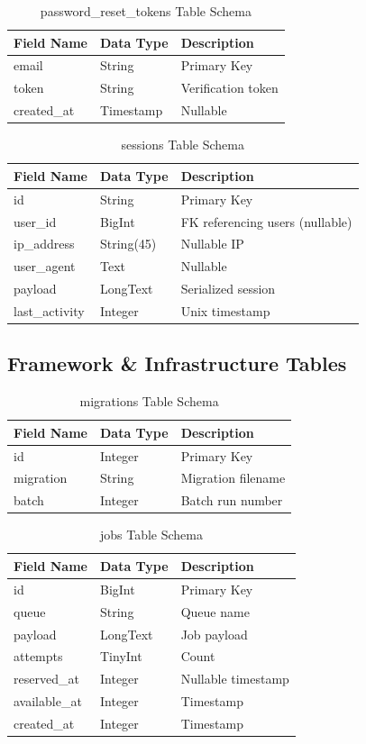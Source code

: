 \begin{longtable}{|l|l|p{7.5cm}|}
\caption{password\_reset\_tokens Table Schema} \\
\hline
\textbf{Field Name} & \textbf{Data Type} & \textbf{Description} \\ \hline
email & String & Primary Key \\ \hline
token & String & Verification token \\ \hline
created\_at & Timestamp & Nullable \\ \hline
\end{longtable}

\begin{longtable}{|l|l|p{7.5cm}|}
\caption{sessions Table Schema} \\
\hline
\textbf{Field Name} & \textbf{Data Type} & \textbf{Description} \\ \hline
id & String & Primary Key \\ \hline
user\_id & BigInt & FK referencing users (nullable) \\ \hline
ip\_address & String(45) & Nullable IP \\ \hline
user\_agent & Text & Nullable \\ \hline
payload & LongText & Serialized session \\ \hline
last\_activity & Integer & Unix timestamp \\ \hline
\end{longtable}

\subsection{Framework \& Infrastructure Tables}
\begin{longtable}{|l|l|p{7.5cm}|}
\caption{migrations Table Schema} \\
\hline
\textbf{Field Name} & \textbf{Data Type} & \textbf{Description} \\ \hline
id & Integer & Primary Key \\ \hline
migration & String & Migration filename \\ \hline
batch & Integer & Batch run number \\ \hline
\end{longtable}

\begin{longtable}{|l|l|p{7.5cm}|}
\caption{jobs Table Schema} \\
\hline
\textbf{Field Name} & \textbf{Data Type} & \textbf{Description} \\ \hline
id & BigInt & Primary Key \\ \hline
queue & String & Queue name \\ \hline
payload & LongText & Job payload \\ \hline
attempts & TinyInt & Count \\ \hline
reserved\_at & Integer & Nullable timestamp \\ \hline
available\_at & Integer & Timestamp \\ \hline
created\_at & Integer & Timestamp \\ \hline
\end{longtable}

